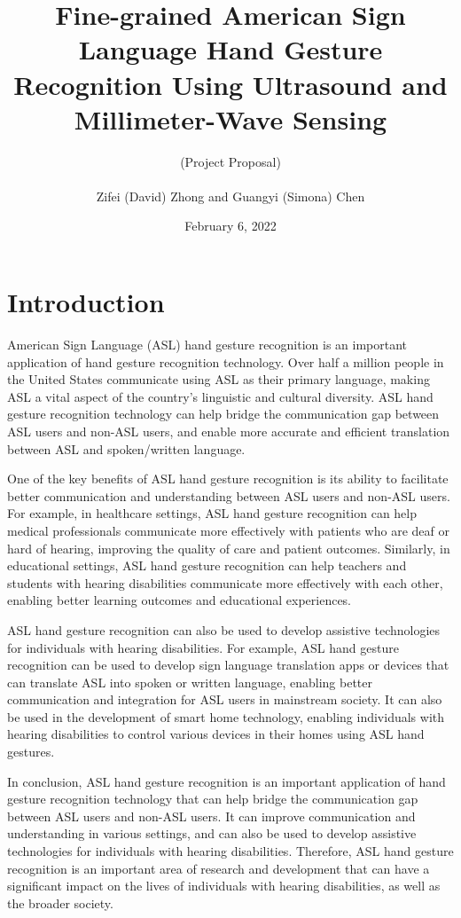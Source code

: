 \documentclass[11pt, oneside]{article}   	%
\title{Fine-grained American Sign Language Hand Gesture Recognition Using Ultrasound and Millimeter-Wave Sensing}
\author{(Project Proposal)\\ \\Zifei (David) Zhong and Guangyi (Simona) Chen}
\date{February 6, 2022}							%
\begin{document}
\maketitle

\section{Introduction}
American Sign Language (ASL) hand gesture recognition is an important application of hand gesture recognition technology. Over half a million people in the United States communicate using ASL as their primary language, making ASL a vital aspect of the country's linguistic and cultural diversity. ASL hand gesture recognition technology can help bridge the communication gap between ASL users and non-ASL users, and enable more accurate and efficient translation between ASL and spoken/written language.

One of the key benefits of ASL hand gesture recognition is its ability to facilitate better communication and understanding between ASL users and non-ASL users. For example, in healthcare settings, ASL hand gesture recognition can help medical professionals communicate more effectively with patients who are deaf or hard of hearing, improving the quality of care and patient outcomes. Similarly, in educational settings, ASL hand gesture recognition can help teachers and students with hearing disabilities communicate more effectively with each other, enabling better learning outcomes and educational experiences.

ASL hand gesture recognition can also be used to develop assistive technologies for individuals with hearing disabilities. For example, ASL hand gesture recognition can be used to develop sign language translation apps or devices that can translate ASL into spoken or written language, enabling better communication and integration for ASL users in mainstream society. It can also be used in the development of smart home technology, enabling individuals with hearing disabilities to control various devices in their homes using ASL hand gestures.

In conclusion, ASL hand gesture recognition is an important application of hand gesture recognition technology that can help bridge the communication gap between ASL users and non-ASL users. It can improve communication and understanding in various settings, and can also be used to develop assistive technologies for individuals with hearing disabilities. Therefore, ASL hand gesture recognition is an important area of research and development that can have a significant impact on the lives of individuals with hearing disabilities, as well as the broader society.
\end{document}
